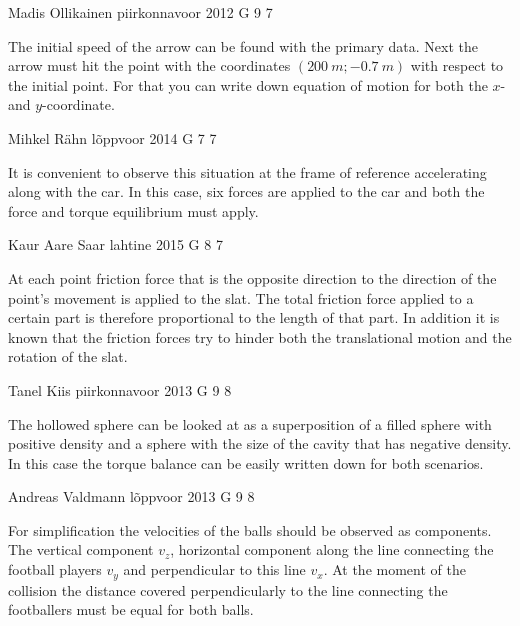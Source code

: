 \documentclass[11pt]{article}
\begin{document}
{Madis Ollikainen} %
{piirkonnavoor} %
{2012} %
{G 9} %
{7} %
{

\ifEngHint
The initial speed of the arrow can be found with the primary data. Next the arrow must hit the point with the coordinates $(\SI{200}{m};\SI{-0,7}{m})$ with respect to the initial point. For that you can write down equation of motion for both the $x$- and $y$-coordinate.
\fi
}

{Mihkel Rähn} %
{lõppvoor} %
{2014} %
{G 7} %
{7} %
{

\ifEngHint
It is convenient to observe this situation at the frame of reference accelerating along with the car. In this case, six forces are applied to the car and both the force and torque equilibrium must apply.
\fi
}

{Kaur Aare Saar} %
{lahtine} %
{2015} %
{G 8} %
{7} %
{

\ifEngHint
At each point friction force that is the opposite direction to the direction of the point’s movement is applied to the slat. The total friction force applied to a certain part is therefore proportional to the length of that part. In addition it is known that the friction forces try to hinder both the translational motion and the rotation of the slat.
\fi
}

{Tanel Kiis} %
{piirkonnavoor} %
{2013} %
{G 9} %
{8} %
{

\ifEngHint
The hollowed sphere can be looked at as a superposition of a filled sphere with positive density and a sphere with the size of the cavity that has negative density. In this case the torque balance can be easily written down for both scenarios.
\fi
}

{Andreas Valdmann} %
{lõppvoor} %
{2013} %
{G 9} %
{8} %
{

\ifEngHint
For simplification the velocities of the balls should be observed as components. The vertical component $v_z$, horizontal component along the line connecting the football players $v_y$ and perpendicular to this line $v_x$. At the moment of the collision the distance covered perpendicularly to the line connecting the footballers must be equal for both balls.
\fi
}
\end{document}
